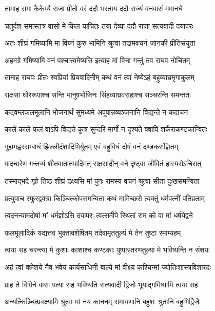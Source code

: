 \twolineshloka
{तामाह रामः कैकेय्यै राजा प्रीतो वरं ददौ}
{भरताय ददौ राज्यं वनवासं ममानघे} %

\twolineshloka
{चतुर्दश समास्तत्र वासो मे किल याचितः}
{तया देव्या ददौ राजा सत्यवादी दयापरः} %

\twolineshloka
{अतः शीघ्रं गमिष्यामि मा विघ्नं कुरु भामिनि}
{श्रुत्वा तद्रामवचनं जानकी प्रीतिसंयुता} %

\twolineshloka
{अहमग्रे गमिष्यामि वनं पश्चात्त्वमेष्यसि}
{इत्याह मां विना गन्तुं तव राघव नोचितम्} %

\twolineshloka
{तामाह राघवः प्रीतः स्वप्रियां प्रियवादिनीम्}
{कथं वनं त्वां नेष्येऽहं बहुव्याघ्रमृगाकुलम्} %

\twolineshloka
{राक्षसा घोररूपाश्च सन्ति मानुषभोजिनः}
{सिंहव्याघ्रवराहाश्च सञ्चरन्ति समन्ततः} %

\twolineshloka
{कट्वम्लफलमूलानि भोजनार्थं सुमध्यमे}
{अपूपान्नव्यञ्जनानि विद्यन्ते न कदाचन} %

\twolineshloka
{काले काले फलं वाऽपि विद्यते कुत्र सुन्दरि}
{मार्गो न दृश्यते क्वापि शर्कराकण्टकान्वितः} %

\twolineshloka
{गुहागह्वरसम्बाधं झिल्लीदंशादिभिर्युतम्}
{एवं बहुविधं दोषं वनं दण्डकसंज्ञितम्} %

\twolineshloka
{पादचारेण गन्तव्यं शीतवातातपादिमत्}
{राक्षसादीन् वने दृष्ट्वा जीवितं हास्यसेऽचिरात्} %

\twolineshloka
{तस्माद्भद्रे गृहे तिष्ठ शीघ्रं द्रक्ष्यसि मां पुनः}
{रामस्य वचनं श्रुत्वा सीता दुःखसमन्विता} %

\twolineshloka
{प्रत्युवाच स्फुरद्वक्त्रा किञ्चित्कोपसमन्विता}
{कथं मामिच्छसे त्यक्तुं धर्मपत्नीं पतिव्रताम्} %

\twolineshloka
{त्वदनन्यामदोषां मां धर्मज्ञोऽसि दयापरः}
{त्वत्समीपे स्थितां राम को वा मां धर्षयेद्वने} %

\twolineshloka
{फलमूलादिकं यद्यत्तव भुक्तावशेषितम्}
{तदेवामृततुल्यं मे तेन तुष्टा रमाम्यहम्} %

\twolineshloka
{त्वया सह चरन्त्या मे कुशाः काशाश्च कण्टकाः}
{पुष्पास्तरणतुल्या मे भविष्यन्ति न संशयः} %

\twolineshloka
{अहं त्वां क्लेशये नैव भवेयं कार्यसाधिनी}
{बाल्ये मां वीक्ष्य कश्चिन्मां ज्योतिःशास्त्रविशारदः} %

\twolineshloka
{प्राह ते विपिने वासः पत्या सह भविष्यति}
{सत्यवादी द्विजो भूयाद्गमिष्यामि त्वया सह} %

\twolineshloka
{अन्यत्किञ्चित्प्रवक्ष्यामि श्रुत्वा मां नय काननम्}
{रामायणानि बहुशः श्रुतानि बहुभिर्द्विजैः} %

